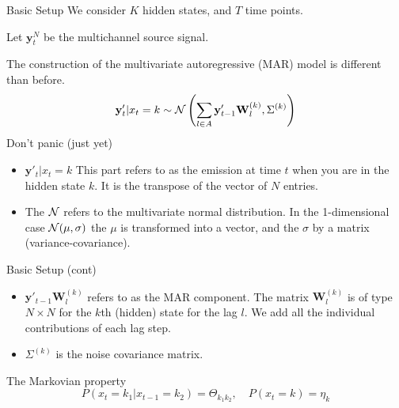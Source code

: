\documentclass{beamer}
\begin{document}
\begin{frame}{Basic Setup}
	We consider $K$ hidden states, and $T$ time points.
	
	Let $\mathbf{y}_t^N$ be the multichannel source signal. 
	
	The construction of the multivariate autoregressive (MAR) model is different than before. 
	\begin{equation}
		\mathbf{y}'_t | x_t =k  \sim {\cal N}\left(\sum_{l\in A} 
		\mathbf{y}'_{t-1} \mathbf{W}_l^{(k)}, \Sigma^{(k)}\right)
	\end{equation}
Don't panic (just yet)
\begin{itemize}
\item $\mathbf{y}'_t | x_t =k $ This part refers to as the emission at time $t$ when you are in the hidden state $k$. It is the transpose of the vector of $N$ entries.
\item The $\cal N$ refers to the multivariate normal distribution. In the 1-dimensional case ${\cal N}(\mu, \sigma)$ the $\mu$ is transformed into a vector, and the $\sigma$ by a matrix (variance-covariance). 

\end{itemize}
	
\end{frame}
\begin{frame}{Basic Setup (cont)}
\begin{itemize}
	\item $\mathbf{y}'_{t-1} \mathbf{W}_l^{(k)}$ refers to as the MAR component. The matrix $ \mathbf{W}_l^{(k)}$ is of type $N\times N$ for the $k$th (hidden) state for the lag $l$. We add all the individual contributions of each lag step.
	\item $\Sigma^{(k)}$ is the noise covariance matrix.   
\end{itemize}
The Markovian property 
\begin{equation}
	P(x_t=k_1|x_{t-1}=k_2)= \Theta_{k_1k_2}, \quad P(x_t=k)= \eta_k
\end{equation}
\end{frame}
\end{document}
